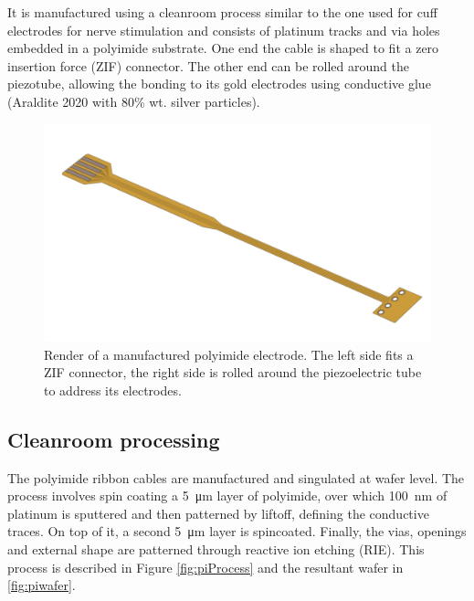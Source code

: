 It is manufactured using a cleanroom process similar to the one used for cuff electrodes for nerve stimulation \cite{Rodriguez2000} and consists of platinum tracks and via holes embedded in a polyimide substrate. One end the cable is shaped to fit a zero insertion force (ZIF) connector. The other end can be rolled around the piezotube, allowing the bonding to its gold electrodes using conductive glue (Araldite 2020 with 80\% wt. silver particles).

\begin{figure}[h!]\centering \includegraphics[width=15cm]{figures/40_Fabrication/PI/render.JPG}
      \caption{Render of a manufactured polyimide electrode. The left side fits a ZIF connector, the right side is rolled around the piezoelectric tube to address its electrodes.}
      \label{fig:piRender}
\end{figure}



\subsection{Cleanroom processing}
The polyimide ribbon cables are manufactured and singulated at wafer level. The process involves spin coating a \SI{5}{\micro\meter} layer of polyimide, over which \SI{100}{\nano\meter} of platinum is sputtered and then patterned by liftoff, defining the conductive traces. On top of it, a second \SI{5}{\micro\meter} layer is spincoated. Finally, the vias, openings and external shape are patterned through reactive ion etching (RIE). This process is described in Figure \ref{fig:piProcess} and the resultant wafer in \autoref{fig:piwafer}.


